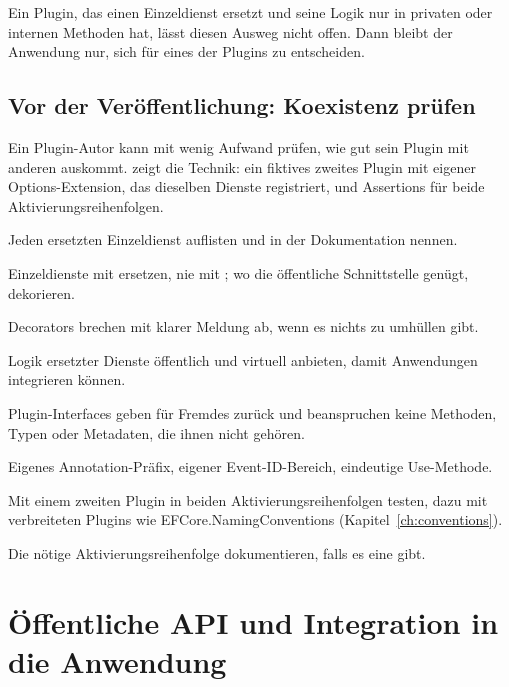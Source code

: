 Ein Plugin, das einen Einzeldienst ersetzt und seine Logik nur in privaten oder internen
Methoden hat, lässt diesen Ausweg nicht offen. Dann bleibt der Anwendung nur, sich für eines
der Plugins zu entscheiden.

\section{Vor der Veröffentlichung: Koexistenz prüfen}

Ein Plugin-Autor kann mit wenig Aufwand prüfen, wie gut sein Plugin mit anderen auskommt.
 zeigt die Technik: ein fiktives
zweites Plugin mit eigener Options-Extension, das dieselben Dienste registriert, und
Assertions für beide Aktivierungsreihenfolgen.

\begin{checklist}
  \item Jeden ersetzten Einzeldienst auflisten und in der Dokumentation nennen.
  \item Einzeldienste mit  ersetzen, nie mit ; wo die
    öffentliche Schnittstelle genügt, dekorieren.
  \item Decorators brechen mit klarer Meldung ab, wenn es nichts zu umhüllen gibt.
  \item Logik ersetzter Dienste öffentlich und virtuell anbieten, damit Anwendungen
    integrieren können.
  \item Plugin-Interfaces geben für Fremdes  zurück und beanspruchen keine
    Methoden, Typen oder Metadaten, die ihnen nicht gehören.
  \item Eigenes Annotation-Präfix, eigener Event-ID-Bereich, eindeutige Use-Methode.
  \item Mit einem zweiten Plugin in beiden Aktivierungsreihenfolgen testen, dazu mit
    verbreiteten Plugins wie EFCore.NamingConventions (Kapitel~\ref{ch:conventions}).
  \item Die nötige Aktivierungsreihenfolge dokumentieren, falls es eine gibt.
\end{checklist}

\chapter{Öffentliche API und Integration in die Anwendung}\label{ch:public-api-and-integration-into}

